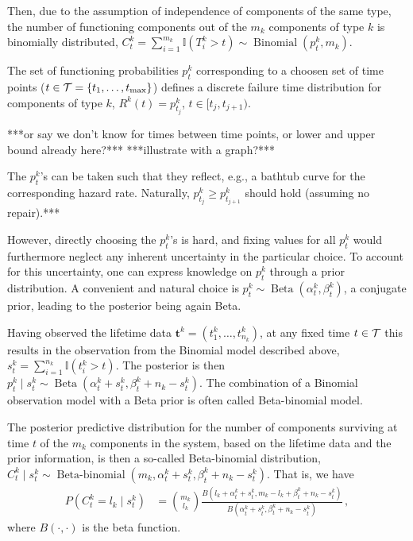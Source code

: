 \documentclass[authoryear, 12pt, a4paper]{elsarticle}
\renewcommand{\vec}[1]{{\bm#1}}
\newcommand{\indic}{\mathbb{I}}
\newcommand{\bin}{\operatorname{Binomial}}
\newcommand{\be}{\operatorname{Beta}}
\newcommand{\bebin}{\operatorname{Beta-binomial}}
\def\tmax{t_\text{max}}
\begin{document}
Then, due to the assumption of independence of components of the same type, 
the number of functioning components out of the $m_k$ components of type $k$
is binomially distributed, $C^k_t = \sum_{i=1}^{m_k} \indic(T^k_i > t) \sim \bin(p^k_t, m_k)$.

The set of functioning probabilities $p^k_t$
corresponding to a choosen set of time points ($t \in {\cal T} = \{t_1, \ldots, \tmax\}$)
defines a discrete failure time distribution for components of type $k$,
$R^k(t) = p^k_{t_j}$, $t \in [t_j, t_{j+1})$.

***or say we don't know for times between time points, or lower and upper bound already here?***
***illustrate with a graph?***

%

The $p^k_t$'s can be taken such that they reflect, e.g., a bathtub curve for the corresponding hazard rate.
Naturally, $p^k_{t_j} \ge p^k_{t_{j+1}}$ should hold (assuming no repair).***

However, directly choosing the $p^k_t$'s is hard,
and fixing values for all $p^k_t$ would furthermore neglect any inherent uncertainty in the particular choice.  
To account for this uncertainty, one can express knowledge on $p^k_t$ through a prior distribution.
A convenient and natural choice is $p^k_t \sim \be(\alpha^k_t, \beta^k_t)$, a conjugate prior,
leading to the posterior being again Beta.

Having observed the lifetime data $\vec{t}^k = (t^k_1, \ldots, t^k_{n_k})$,
at any fixed time $t \in {\cal T}$ this results in the observation from the Binomial model described above,
$s^k_t = \sum_{i=1}^{n_k} \indic(t^k_i > t)$.
The posterior is then $p^k_t \mid s^k_t \sim \be(\alpha^k_t + s^k_t, \beta^k_t + n_k - s^k_t)$.
The combination of a Binomial observation model with a Beta prior is often called Beta-binomial model.

The posterior predictive distribution for the number of components surviving at time $t$
of the $m_k$ components in the system, based on the lifetime data and the prior information,
is then a so-called Beta-binomial distribution,
$C^k_t \mid s^k_t \sim \bebin(m_k, \alpha^k_t + s^k_t, \beta^k_t + n_k - s^k_t)$.
That is, we have
\begin{align*}
P(C^k_t = l_k \mid s^k_t) &= {m_k \choose l_k} \frac{B(l_k + \alpha^k_t + s^k_t, m_k - l_k + \beta^k_t + n_k - s^k_t)}
                                                    {B(\alpha^k_t + s^k_t, \beta^k_t + n_k - s^k_t)} \,,
\end{align*}
where $B(\cdot, \cdot)$ is the beta function.
\end{document}
